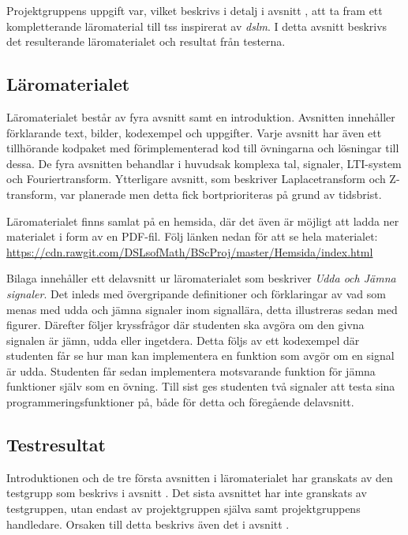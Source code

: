 \documentclass[12pt,a4paper,twoside,openright]{article}
\begin{document}

%
Projektgruppens uppgift var, vilket beskrivs i detalj i avsnitt
, att ta fram ett kompletterande läromaterial
till \gls{tss} inspirerat av \textit{\gls{dslm}}. I detta avsnitt
beskrivs det resulterande läromaterialet och resultat från testerna.

\subsection{Läromaterialet}

Läromaterialet består av fyra avsnitt samt en introduktion. Avsnitten
innehåller förklarande text, bilder, kodexempel och uppgifter. Varje
avsnitt har även ett tillhörande kodpaket med förimplementerad kod
till övningarna och lösningar till dessa. De fyra avsnitten behandlar
i huvudsak komplexa tal, signaler, LTI-system och Fouriertransform.
Ytterligare avsnitt, som beskriver Laplacetransform och Z-transform,
var planerade men detta fick bortprioriteras på grund av tidsbrist.

Läromaterialet finns samlat på en hemsida, där det även är möjligt att
ladda ner materialet i form av en PDF-fil. Följ länken nedan för att
se hela materialet:
\url{https://cdn.rawgit.com/DSLsofMath/BScProj/master/Hemsida/index.html}

Bilaga  innehåller ett delavsnitt ur läromaterialet som
beskriver \textit{Udda och Jämna signaler}. Det inleds med
övergripande definitioner och förklaringar av vad som menas med udda
och jämna signaler inom signallära, detta illustreras sedan med
figurer. Därefter följer kryssfrågor där studenten ska avgöra om den
givna signalen är jämn, udda eller ingetdera. Detta följs av ett
kodexempel där studenten får se hur man kan implementera en funktion
som avgör om en signal är udda. Studenten får sedan implementera
motsvarande funktion för jämna funktioner själv som en övning. Till
sist ges studenten två signaler att testa sina
programmeringsfunktioner på, både för detta och föregående delavsnitt.


\subsection{Testresultat}
\label{sec:testResultat}
Introduktionen och de tre första avsnitten i läromaterialet har
granskats av den testgrupp som beskrivs i avsnitt
. Det sista avsnittet har inte granskats av
testgruppen, utan endast av projektgruppen själva samt projektgruppens
handledare. Orsaken till detta beskrivs även det i avsnitt
.
\end{document}
